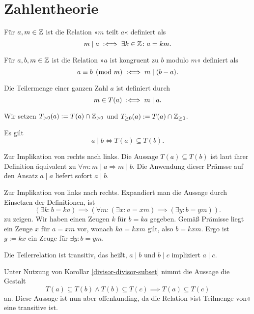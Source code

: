 
\chapter{Zahlentheorie}

\begin{Definition}[Teiler] Für $a,m\in\mathbb Z$ ist die Relation »$m$ teilt
$a$« definiert als
\[m\mid a\;:\Longleftrightarrow\; \exists k\in\mathbb Z\colon a = km.\]
\end{Definition}

\begin{Definition}[Kongruenz]
Für $a,b,m\in\mathbb Z$ ist die Relation »$a$ ist kongruent zu $b$ modulo
$m$« definiert als
\[a\equiv b \pmod m \;:\Longleftrightarrow\; m\mid (b-a).\]
\end{Definition}

\begin{Definition}[Teilermenge] Die Teilermenge
einer ganzen Zahl $a$ ist definiert durch
\[m\in T(a)\;:\Longleftrightarrow\; m\mid a.\]
\end{Definition}
 Wir setzen $T_{>0}(a):=T(a)\cap\mathbb Z_{>0}$ und
$T_{\ge 0}(a):=T(a)\cap\mathbb Z_{\ge 0}$.

\begin{Korollar}\label{divisor-divisor-subset} Es gilt
\[a\mid b \iff T(a)\subseteq T(b).\]
\end{Korollar}
\begin{Beweis}
Zur Implikation von rechts nach links.
Die Aussage $T(a)\subseteq T(b)$ ist laut ihrer Definition
äquivalent zu $\forall m\colon m\mid a\Rightarrow m\mid b$.
Die Anwendung dieser Prämsse auf den Ansatz $a\mid a$
liefert sofort $a\mid b$.

Zur Implikation von links nach rechts. Expandiert man die Aussage
durch Einsetzen der Definitionen, ist
\[(\exists k\colon b=ka)\implies
(\forall m\colon (\exists x\colon a=xm)\implies (\exists y\colon b=ym)).\]
zu zeigen. Wir haben einen Zeugen $k$ für $b=ka$ gegeben. 
Gemäß Prämisse liegt ein Zeuge $x$ für $a=xm$ vor, wonach $ka=kxm$
gilt, also $b=kxm$. Ergo ist $y:=kx$ ein Zeuge für
$\exists y\colon b=ym$.\,\qedsymbol
\end{Beweis}

\begin{Korollar}
Die Teilerrelation ist transitiv, das heißt,
$a\mid b$ und $b\mid c$ impliziert $a\mid c$.
\end{Korollar}
\begin{Beweis}
Unter Nutzung von Korollar \ref{divisor-divisor-subset}
nimmt die Aussage die Gestalt
\[T(a)\subseteq T(b)\land T(b)\subseteq T(c)\implies T(a)\subseteq T(c)\]
an. Diese Aussage ist nun aber offenkunding, da die Relation »ist
Teilmenge von« eine transitive ist.\,\qedsymbol
\end{Beweis}
